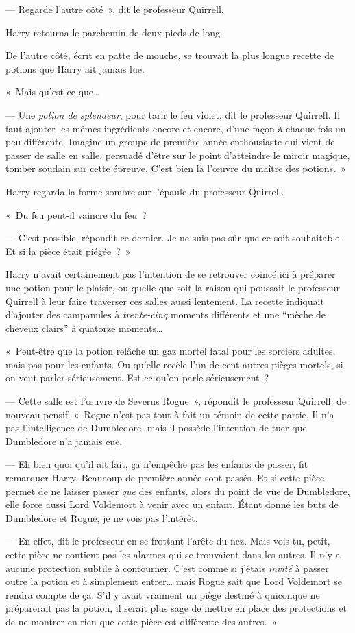 --- Regarde l'autre côté~», dit le professeur Quirrell.

Harry retourna le parchemin de deux pieds de long.

De l'autre côté, écrit en patte de mouche, se trouvait la plus longue recette de potions que Harry ait jamais lue.

«~Mais qu'est-ce que…

--- Une \emph{potion de splendeur}, pour tarir le feu violet, dit le professeur Quirrell.
Il faut ajouter les mêmes ingrédients encore et encore, d'une façon à chaque fois un peu différente.
Imagine un groupe de première année enthousiaste qui vient de passer de salle en salle, persuadé d'être sur le point d'atteindre le miroir magique, tomber soudain sur cette épreuve.
C'est bien là l'œuvre du maître des potions.~»

Harry regarda la forme sombre sur l'épaule du professeur Quirrell.

«~Du feu peut-il vaincre du feu~?

--- C'est possible, répondit ce dernier.
Je ne suis pas sûr que ce soit souhaitable.
Et si la pièce était piégée~?~»

Harry n'avait certainement pas l'intention de se retrouver coincé ici à préparer une potion pour le plaisir, ou quelle que soit la raison qui poussait le professeur Quirrell à leur faire traverser ces salles aussi lentement.
La recette indiquait d'ajouter des campanules à \emph{trente-cinq} moments différents et une “mèche de cheveux clairs” à quatorze moments…

«~Peut-être que la potion relâche un gaz mortel fatal pour les sorciers adultes, mais pas pour les enfants.
Ou qu'elle recèle l'un de cent autres pièges mortels, si on veut parler sérieusement.
Est-ce qu'on parle sérieusement~?

--- Cette salle est l'œuvre de Severus Rogue~», répondit le professeur Quirrell, de nouveau pensif.
«~Rogue n'est pas tout à fait un témoin de cette partie.
Il n'a pas l'intelligence de Dumbledore, mais il possède l'intention de tuer que Dumbledore n'a jamais eue.

--- Eh bien quoi qu'il ait fait, ça n'empêche pas les enfants de passer, fit remarquer Harry.
Beaucoup de première année sont passés.
Et si cette pièce permet de ne laisser passer \emph{que} des enfants, alors du point de vue de Dumbledore, elle force aussi Lord Voldemort à venir avec un enfant.
Étant donné les buts de Dumbledore et Rogue, je ne vois pas l'intérêt.

--- En effet, dit le professeur en se frottant l'arête du nez.
Mais vois-tu, petit, cette pièce ne contient pas les alarmes qui se trouvaient dans les autres.
Il n'y a aucune protection subtile à contourner.
C'est comme si j'étais \emph{invité} à passer outre la potion et à simplement entrer… mais Rogue sait que Lord Voldemort se rendra compte de ça.
S'il y avait vraiment un piège destiné à quiconque ne préparerait pas la potion, il serait plus sage de mettre en place des protections et de ne montrer en rien que cette pièce est différente des autres.~»

